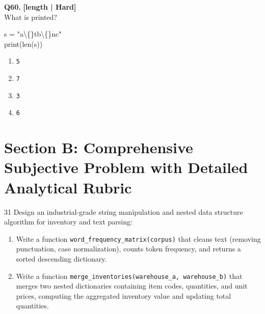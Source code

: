 \noindent\textbf{Q60.} \hfill {\small\color{LPUOrange}\textbf{[length | Hard]}}\\[2pt]
What is printed? 

\begin{pycode}
s = "a\textbackslash\{\}tb\textbackslash\{\}nc"\\
print(len(s))
\end{pycode}

\begin{enumerate}[label=(\alph*),topsep=2pt,itemsep=1pt,partopsep=0pt,parsep=0pt]
    \item \relax \texttt{5}
    \item \relax \texttt{7}
    \item \relax \texttt{3}
    \item \relax \texttt{6}
\end{enumerate}
\vspace{2mm}


\newpage
\section{Section B: Comprehensive Subjective Problem with Detailed Analytical Rubric}

\begin{subjectiveq}{3}{1}
Design an industrial-grade string manipulation and nested data structure algorithm for inventory and text parsing:
\begin{enumerate}[label=(\alph*)]
    \item Write a function \texttt{word\_frequency\_matrix(corpus)} that cleans text (removing punctuation, case normalization), counts token frequency, and returns a sorted descending dictionary.
    \item Write a function \texttt{merge\_inventories(warehouse\_a, warehouse\_b)} that merges two nested dictionaries containing item codes, quantities, and unit prices, computing the aggregated inventory value and updating total quantities.
\end{enumerate}
\end{subjectiveq}

